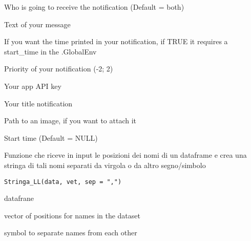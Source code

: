 \documentclass[a4paper]{book}
\begin{document}
%
\begin{Arguments}
\begin{ldescription}
\item[\code{dest}] Who is going to receive the notification (Default = both)

\item[\code{script}] Text of your message

\item[\code{timestamp}] If you want the time printed in your notification, if TRUE it requires a start\_time in the .GlobalEnv

\item[\code{priority}] Priority of your notification (-2; 2)

\item[\code{app}] Your app API key

\item[\code{title}] Your title notification

\item[\code{attachment}] Path to an image, if you want to attach it

\item[\code{start\_time}] Start time (Default = NULL)
\end{ldescription}
\end{Arguments}
%
\begin{Description}
Funzione che riceve in input le posizioni dei nomi di un dataframe e crea una stringa di tali nomi separati da virgola o da altro segno/simbolo
\end{Description}
%
\begin{Usage}
\begin{verbatim}
Stringa_LL(data, vet, sep = ",")
\end{verbatim}
\end{Usage}
%
\begin{Arguments}
\begin{ldescription}
\item[\code{data}] datafrane

\item[\code{vet}] vector of positions for names in the dataset

\item[\code{sep}] symbol to separate names from each other
\end{ldescription}
\end{Arguments}
\end{document}
